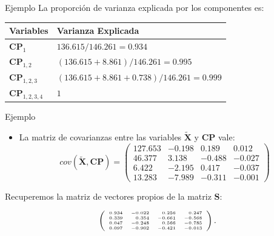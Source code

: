 \documentclass[
  ignorenonframetext,
]{beamer}
\providecommand{\tightlist}{%
  \setlength{\itemsep}{0pt}\setlength{\parskip}{0pt}}
\begin{document}
\begin{frame}{Ejemplo}
\protect\hypertarget{ejemplo-18}{}
La proporción de varianza explicada por los componentes es:

\begin{tabular}{|l|l|}\hline
Variables&Varianza Explicada\\\hline
$\mathbf{CP}_1$&$136.615/146.261=0.934$\\\hline
$\mathbf{CP}_{1,2}$&$(136.615+8.861)/146.261=0.995$\\\hline
$\mathbf{CP}_{1,2,3}$&$(136.615+8.861+0.738)/146.261=0.999$\\\hline
$\mathbf{CP}_{1,2,3,4}$&$1$\\\hline
\end{tabular}
\end{frame}

\begin{frame}{Ejemplo}
\protect\hypertarget{ejemplo-19}{}
\begin{itemize}
\tightlist
\item
  La matriz de covarianzas entre las variables \(\tilde{\mathbf{X}}\) y
  \(\mathbf{CP}\) vale: \[
  cov(\tilde{\mathbf{X}},\mathbf{CP})=
  \left(
  \begin{array}{rrrr}
  127.653 & -0.198 & 0.189 & 0.012 \\
   46.377 & 3.138 & -0.488 & -0.027 \\
   6.422 & -2.195 & 0.417 & -0.037 \\
   13.283 & -7.989 & -0.311 & -0.001 
  \end{array}
  \right)
  \]
\end{itemize}

Recuperemos la matriz de vectores propios de la matriz \(\mathbf{S}\):

\[
{\tiny \left(
\begin{array}{rrrr}
0.934 & -0.022 & 0.256 & 0.247 \\
 0.339 & 0.354 & -0.661 & -0.568 \\
 0.047 & -0.248 & 0.566 & -0.785 \\
 0.097 & -0.902 & -0.421 & -0.013 
\end{array}
\right)
.}
\]
\end{frame}
\end{document}
